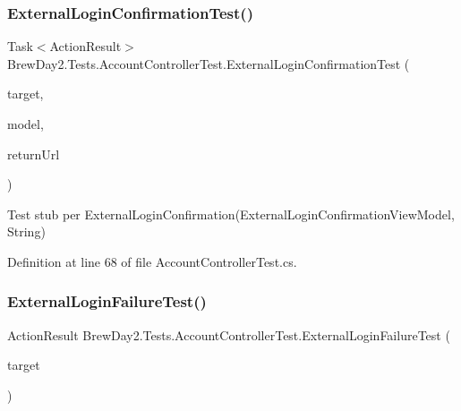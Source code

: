 \subsubsection{\texorpdfstring{External\+Login\+Confirmation\+Test()}{ExternalLoginConfirmationTest()}}
{\footnotesize\ttfamily Task$<$Action\+Result$>$ Brew\+Day2.\+Tests.\+Account\+Controller\+Test.\+External\+Login\+Confirmation\+Test (\begin{DoxyParamCaption}\item[{\mbox{[}\+Pex\+Assume\+Under\+Test\mbox{]} \mbox{\hyperlink{class_brew_day2_1_1_controllers_1_1_account_controller}{Account\+Controller}}}]{target,  }\item[{\mbox{\hyperlink{class_brew_day2_1_1_models_1_1_external_login_confirmation_view_model}{External\+Login\+Confirmation\+View\+Model}}}]{model,  }\item[{string}]{return\+Url }\end{DoxyParamCaption})}



Test stub per External\+Login\+Confirmation(\+External\+Login\+Confirmation\+View\+Model, String)



Definition at line 68 of file Account\+Controller\+Test.\+cs.

\mbox{\label{class_brew_day2_1_1_tests_1_1_account_controller_test_ac772e1db4e993a58cb1c3b031fcbfecf}} 
\subsubsection{\texorpdfstring{External\+Login\+Failure\+Test()}{ExternalLoginFailureTest()}}
{\footnotesize\ttfamily Action\+Result Brew\+Day2.\+Tests.\+Account\+Controller\+Test.\+External\+Login\+Failure\+Test (\begin{DoxyParamCaption}\item[{\mbox{[}\+Pex\+Assume\+Under\+Test\mbox{]} \mbox{\hyperlink{class_brew_day2_1_1_controllers_1_1_account_controller}{Account\+Controller}}}]{target }\end{DoxyParamCaption})}



